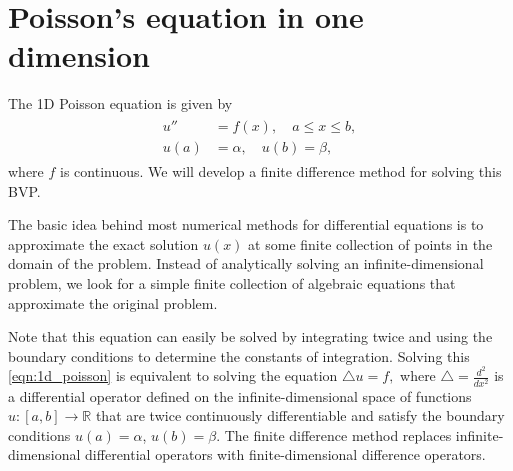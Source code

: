 \section*{Poisson's equation in one dimension}
The 1D Poisson equation is given by 
\begin{align}
	\begin{split}
u'' &= f(x), \quad a \leq x \leq b,\\
	u(a) &= \alpha,\quad u(b) = \beta,
	\end{split} \label{eqn:1d_poisson}
\end{align}
where $f$ is continuous.
We will develop a finite difference method for solving this BVP. 

The basic idea behind most numerical methods for differential equations is to approximate the exact solution $u(x)$ at some finite collection of points in the 
domain of the problem.
Instead of analytically solving an infinite-dimensional problem, we look for a simple finite collection of algebraic equations that approximate the original problem.

Note that this equation can easily be solved by integrating twice and using the boundary conditions to determine the constants of integration.
Solving this \eqref{eqn:1d_poisson} is equivalent to solving the equation $\triangle u = f,$ where $\triangle = \frac{d^2}{dx^2}$ is a differential operator defined on the infinite-dimensional space of functions $u:[a,b] \to \mathbb{R}$ that are twice continuously differentiable and satisfy the boundary conditions $u(a) = \alpha$, $u(b) = \beta$.
The finite difference method replaces infinite-dimensional differential operators with finite-dimensional difference operators.

